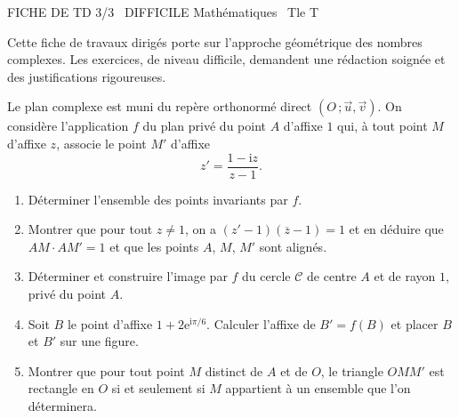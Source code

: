 \documentclass[11pt]{article}
\begin{document}
\begin{tcolorbox}[enhanced,colback=popink,colframe=popink,arc=10pt,boxrule=0pt,left=12pt,right=12pt,top=9pt,bottom=9pt]
{\color{white}\popxbold\small FICHE DE TD 3/3 \textbullet\ DIFFICILE \hfill Mathématiques \textbullet\ Tle T\par}
\end{tcolorbox}
\vspace{4pt}
Cette fiche de travaux dirigés porte sur l'approche géométrique des nombres complexes. Les exercices, de niveau difficile, demandent une rédaction soignée et des justifications rigoureuses.

\begin{exercice}
Le plan complexe est muni du repère orthonormé direct $(O\,;\vec{u},\vec{v})$. On considère l'application $f$ du plan privé du point $A$ d'affixe $1$ qui, à tout point $M$ d'affixe $z$, associe le point $M'$ d'affixe
\[z'=\dfrac{1-\mathrm{i}z}{z-1}.\]
\begin{enumerate}
\item Déterminer l'ensemble des points invariants par $f$.
\item Montrer que pour tout $z\neq 1$, on a $(z'-1)(\overline{z}-1)=1$ et en déduire que $AM\cdot AM'=1$ et que les points $A$, $M$, $M'$ sont alignés.
\item Déterminer et construire l'image par $f$ du cercle $\mathcal{C}$ de centre $A$ et de rayon $1$, privé du point $A$.
\item Soit $B$ le point d'affixe $1+2\mathrm{e}^{\mathrm{i}\pi/6}$. Calculer l'affixe de $B'=f(B)$ et placer $B$ et $B'$ sur une figure.
\item Montrer que pour tout point $M$ distinct de $A$ et de $O$, le triangle $OMM'$ est rectangle en $O$ si et seulement si $M$ appartient à un ensemble que l'on déterminera.
\end{enumerate}
\end{exercice}
\end{document}
